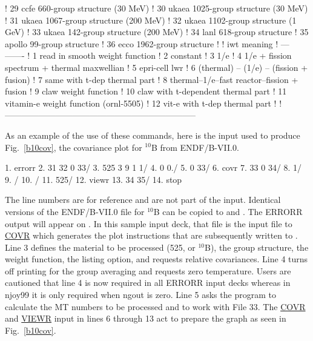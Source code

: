 \begin{ccode}
   !      29           ccfe   660-group structure  (30 MeV)
   !      30           ukaea 1025-group structure  (30 MeV)
   !      31           ukaea 1067-group structure (200 MeV)
   !      32           ukaea 1102-group structure   (1 GeV)
   !      33           ukaea  142-group structure (200 MeV)
   !      34           lanl 618-group structure
   !      35           apollo 99-group structure
   !      36           ecco 1962-group structure
   !
   !      iwt          meaning
   !      ---          -------
   !       1           read in smooth weight function
   !       2           constant
   !       3           1/e
   !       4           1/e + fission spectrum + thermal maxwellian
   !       5           epri-cell lwr
   !       6           (thermal) -- (1/e) -- (fission + fusion)
   !       7           same with t-dep thermal part
   !       8           thermal--1/e--fast reactor--fission + fusion
   !       9           claw weight function
   !      10           claw with t-dependent thermal part
   !      11           vitamin-e weight function (ornl-5505)
   !      12           vit-e with t-dep thermal part
   !
   !--------------------------------------------------------------------

\end{ccode}
\normalsize

As an example of the use of these commands, here is the input used
to produce Fig.~\ref{b10cov}, the covariance plot for $^{10}$B
from ENDF/B-VII.0.

\small
\begin{ccode}

    1. errorr
    2. 31 32 0 33/
    3. 525 3 9 1 1/
    4. 0 0./
    5. 0 33/
    6. covr
    7. 33 0 34/
    8. 1/
    9. /
   10. /
   11. 525/
   12. viewr
   13. 34 35/
   14. stop

\end{ccode}
\normalsize

\noindent
The line numbers are for reference and are not part of the input.
Identical versions of the ENDF/B-VII.0 file for $^{10}$B can be
copied to  and .  The ERRORR output
will appear on .  In this sample input deck, that file
is the input file to \hyperlink{sCOVRhy}{COVR} which
generates the plot instructions that are subsequently written to
.  Line 3 defines the material to be
processed (525, or $^{10}$B), the group structure, the weight function,
the listing option, and requests relative covariances.  Line 4 turns
off printing for the group averaging and requests zero temperature.
Users are cautioned that line 4 is now required in all ERRORR input decks
whereas in njoy99 it is only required when ngout is zero.  Line 5
asks the program to calculate the MT numbers to be processed
and to work with File 33.  The \hyperlink{sCOVRhy}{COVR} and
\hyperlink{sVIEWRhy}{VIEWR} input in lines 6 through
13 act to prepare the graph as seen in Fig.~\ref{b10cov}.

